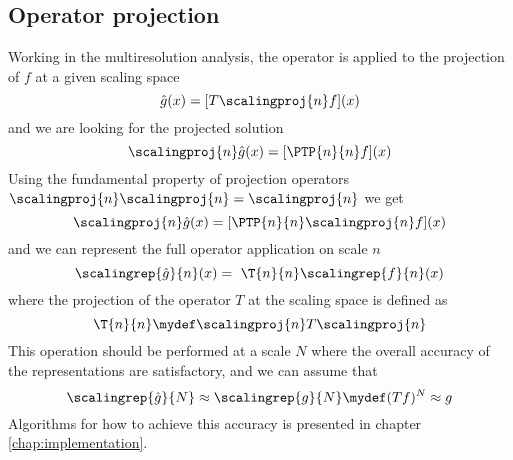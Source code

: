 \subsection{Operator projection}
Working in the multiresolution analysis, the operator is applied to the projection 
of $f$ at a given scaling space 
\begin{equation}
    \hat{g}(x) = [T\scalingproj{n}f](x) 
\end{equation}
and we are looking for the projected solution
\begin{equation}
    \scalingproj{n}\hat{g}(x) = [\PTP{n}{n}f](x) 
\end{equation}
Using the fundamental property of projection operators 
$\scalingproj{n}\scalingproj{n} = \scalingproj{n}$ we get
\begin{equation}
    \scalingproj{n}\hat{g}(x) = [\PTP{n}{n}\scalingproj{n}f](x) 
\end{equation}
and we can represent the full operator application on scale $n$
\begin{equation}
    \scalingrep{\hat{g}}{n} (x) =\ \T{n}{n}\scalingrep{f}{n} (x)
\end{equation}
where the projection of the operator $T$ at the scaling space 
is defined as
\begin{equation}
    \label{eq:defTn}
    \T{n}{n} \mydef \scalingproj{n} T \scalingproj{n}
\end{equation}
This operation should be performed at a scale $N$ where the overall accuracy of
the representations are satisfactory, and we can assume that
\begin{equation}
    \scalingrep{\hat{g}}{N} \approx \scalingrep{g}{N} \mydef (Tf)^N \approx g
\end{equation}
Algorithms for how to achieve this accuracy is presented in chapter 
\ref{chap:implementation}.


